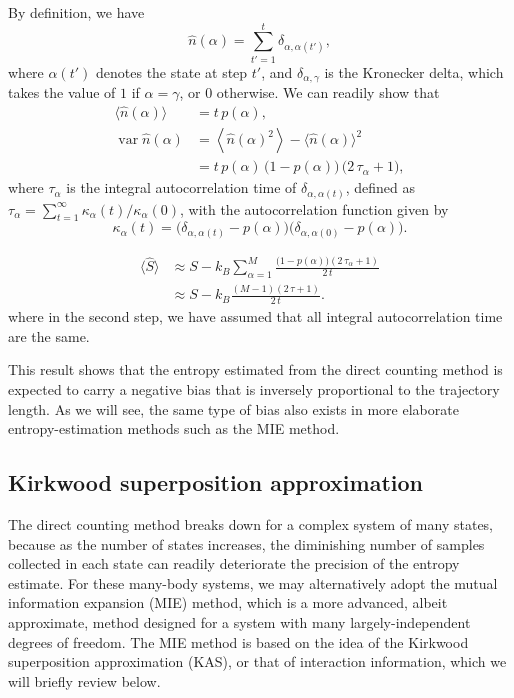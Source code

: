 \documentclass[preprint, superscriptaddress]{revtex4-1}
\begin{document}
By definition, we have
%
\begin{equation*}
  \hat{n}(\alpha) = \sum_{t' = 1}^t \delta_{\alpha, \alpha(t')},
\end{equation*}
%
where $\alpha(t')$ denotes the state at step $t'$,
and $\delta_{\alpha, \gamma}$ is the Kronecker delta,
which takes the value of $1$ if $\alpha = \gamma$, or $0$ otherwise.
%
We can readily show that
\begin{align*}
  \langle \hat{n}(\alpha) \rangle
  &=
  t \, p(\alpha), \\
  \operatorname{var}{\hat{n}(\alpha)}
  &=
  \left\langle \hat{n}(\alpha)^2 \right\rangle - \langle \hat{n}(\alpha) \rangle^2
  \\
  &=
  t \, p(\alpha) \, \bigl( 1 - p(\alpha) \bigr) \, \bigl(2 \, \tau_\alpha + 1\bigr)
  ,
\end{align*}
%
where $\tau_\alpha$ is the integral autocorrelation time of $\delta_{\alpha, \alpha(t)}$,
defined as $\tau_\alpha = \sum_{t = 1}^\infty \kappa_\alpha(t)/\kappa_\alpha(0)$,
with the autocorrelation function given by
$$
\kappa_\alpha(t) = \bigl(\delta_{\alpha, \alpha(t)} - p(\alpha)\bigr)
\bigl(\delta_{\alpha, \alpha(0)} - p(\alpha)\bigr).
$$

\begin{align*}
  \langle \hat S \rangle
  &\approx
  S - k_B \sum_{\alpha = 1}^M
    \frac{ \bigl(1 - p(\alpha)\bigr) ( 2 \, \tau_\alpha + 1) } { 2 \, t }
  \\
  &\approx
  S - k_B
    \frac{ (M - 1) ( 2 \, \tau + 1) } { 2 \, t }
  .
\end{align*}
where in the second step,
we have assumed that all integral autocorrelation time are the same.

This result shows that the entropy estimated
from the direct counting method
is expected to carry a negative bias
that is inversely proportional to the trajectory length.
%
As we will see, the same type of bias also exists
in more elaborate entropy-estimation methods
such as the MIE method.


\subsection{Kirkwood superposition approximation}


The direct counting method breaks down
for a complex system of many states,
because as the number of states increases,
the diminishing number of samples collected in each state
can readily deteriorate the precision of the entropy estimate.
%
For these many-body systems,
we may alternatively adopt
the mutual information expansion (MIE) method,
which is a more advanced, albeit approximate, method designed for a system
with many largely-independent degrees of freedom.
%
The MIE method is based on the idea of
the Kirkwood superposition approximation (KAS)\cite{kirkwood1935},
or that of interaction information\cite{mcgill1954},
which we will briefly review below.
\end{document}
